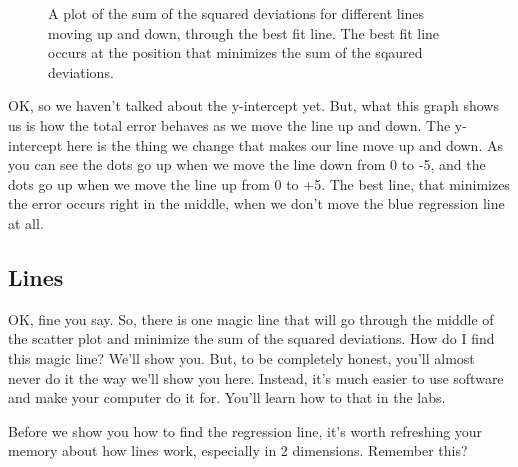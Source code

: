 \documentclass[
  letterpaper,
  DIV=11,
  numbers=noendperiod]{scrreprt}
\begin{document}
\begin{figure}


\caption{\label{fig-3minimizeSS}A plot of the sum of the squared
deviations for different lines moving up and down, through the best fit
line. The best fit line occurs at the position that minimizes the sum of
the sqaured deviations.}

\end{figure}%

OK, so we haven't talked about the y-intercept yet. But, what this graph
shows us is how the total error behaves as we move the line up and down.
The y-intercept here is the thing we change that makes our line move up
and down. As you can see the dots go up when we move the line down from
0 to -5, and the dots go up when we move the line up from 0 to +5. The
best line, that minimizes the error occurs right in the middle, when we
don't move the blue regression line at all.

\subsection{Lines}\label{lines}

OK, fine you say. So, there is one magic line that will go through the
middle of the scatter plot and minimize the sum of the squared
deviations. How do I find this magic line? We'll show you. But, to be
completely honest, you'll almost never do it the way we'll show you
here. Instead, it's much easier to use software and make your computer
do it for. You'll learn how to that in the labs.

Before we show you how to find the regression line, it's worth
refreshing your memory about how lines work, especially in 2 dimensions.
Remember this?
\end{document}
